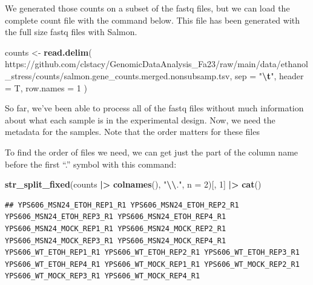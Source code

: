 \documentclass[
]{book}
\newenvironment{Shaded}{\begin{snugshade}}{\end{snugshade}}
\newcommand{\AttributeTok}[1]{\textcolor[rgb]{0.13,0.29,0.53}{#1}}
\newcommand{\DecValTok}[1]{\textcolor[rgb]{0.00,0.00,0.81}{#1}}
\newcommand{\FunctionTok}[1]{\textcolor[rgb]{0.13,0.29,0.53}{\textbf{#1}}}
\newcommand{\NormalTok}[1]{#1}
\newcommand{\OtherTok}[1]{\textcolor[rgb]{0.56,0.35,0.01}{#1}}
\newcommand{\SpecialCharTok}[1]{\textcolor[rgb]{0.81,0.36,0.00}{\textbf{#1}}}
\newcommand{\StringTok}[1]{\textcolor[rgb]{0.31,0.60,0.02}{#1}}
\begin{document}
We generated those counts on a subset of the fastq files, but we can
load the complete count file with the command below. This file has been
generated with the full size fastq files with Salmon.

\begin{Shaded}
\begin{Highlighting}[]
\NormalTok{counts }\OtherTok{\textless{}{-}}
  \FunctionTok{read.delim}\NormalTok{(}
    \StringTok{\textquotesingle{}https://github.com/clstacy/GenomicDataAnalysis\_Fa23/raw/main/data/ethanol\_stress/counts/salmon.gene\_counts.merged.nonsubsamp.tsv\textquotesingle{}}\NormalTok{,}
    \AttributeTok{sep =} \StringTok{"}\SpecialCharTok{\textbackslash{}t}\StringTok{"}\NormalTok{,}
    \AttributeTok{header =}\NormalTok{ T,}
    \AttributeTok{row.names =} \DecValTok{1}
\NormalTok{  )}
\end{Highlighting}
\end{Shaded}

So far, we've been able to process all of the fastq files without much
information about what each sample is in the experimental design. Now,
we need the metadata for the samples. Note that the order matters for
these files

To find the order of files we need, we can get just the part of the
column name before the first ``.'' symbol with this command:

\begin{Shaded}
\begin{Highlighting}[]
\FunctionTok{str\_split\_fixed}\NormalTok{(counts }\SpecialCharTok{|\textgreater{}} \FunctionTok{colnames}\NormalTok{(), }\StringTok{"}\SpecialCharTok{\textbackslash{}\textbackslash{}}\StringTok{."}\NormalTok{, }\AttributeTok{n =} \DecValTok{2}\NormalTok{)[, }\DecValTok{1}\NormalTok{] }\SpecialCharTok{|\textgreater{}} \FunctionTok{cat}\NormalTok{()}
\end{Highlighting}
\end{Shaded}

\begin{verbatim}
## YPS606_MSN24_ETOH_REP1_R1 YPS606_MSN24_ETOH_REP2_R1 YPS606_MSN24_ETOH_REP3_R1 YPS606_MSN24_ETOH_REP4_R1 YPS606_MSN24_MOCK_REP1_R1 YPS606_MSN24_MOCK_REP2_R1 YPS606_MSN24_MOCK_REP3_R1 YPS606_MSN24_MOCK_REP4_R1 YPS606_WT_ETOH_REP1_R1 YPS606_WT_ETOH_REP2_R1 YPS606_WT_ETOH_REP3_R1 YPS606_WT_ETOH_REP4_R1 YPS606_WT_MOCK_REP1_R1 YPS606_WT_MOCK_REP2_R1 YPS606_WT_MOCK_REP3_R1 YPS606_WT_MOCK_REP4_R1
\end{verbatim}
\end{document}
